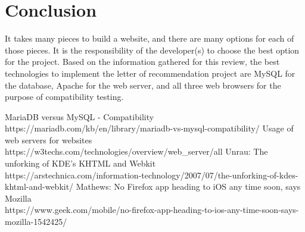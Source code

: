 \documentclass[10pt,draftclsnofoot,onecolumn,journal,compsoc]{IEEEtran}
\begin{document}
\section{Conclusion}
It takes many pieces to build a website, and there are many options for each of those pieces. It is the responsibility of the developer(s) to choose the best option for the project. Based on the information gathered for this review, the best technologies to implement the letter of recommendation project are MySQL for the database, Apache for the web server, and all three web browsers for the purpose of compatibility testing.

\newpage

\begin{thebibliography}{9}
MariaDB versus MySQL - Compatibility\\
https://mariadb.com/kb/en/library/mariadb-vs-mysql-compatibility/
Usage of web servers for websites\\
https://w3techs.com/technologies/overview/web\_server/all
Unrau: The unforking of KDE’s KHTML and Webkit\\
https://arstechnica.com/information-technology/2007/07/the-unforking-of-kdes-khtml-and-webkit/
Mathews: No Firefox app heading to iOS any time soon, says Mozilla\\
https://www.geek.com/mobile/no-firefox-app-heading-to-ios-any-time-soon-says-mozilla-1542425/
\end{thebibliography}
\end{document}
